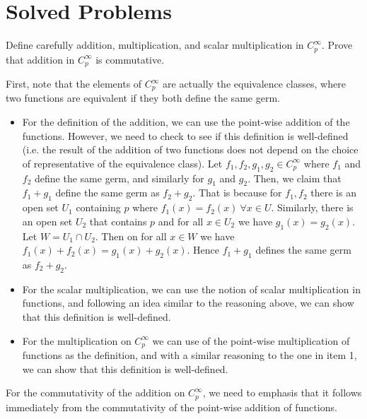 \section{Solved Problems}
\begin{problem}
	Define carefully addition, multiplication, and scalar multiplication in $ C_p^\infty $. Prove that addition in $ C_p^\infty $ is commutative.
\end{problem}
\begin{solution}
	First, note that the elements of $ C_p^\infty $ are actually the equivalence classes, where two functions are equivalent if they both define the same germ.
	\begin{itemize}
		\item For the definition of the addition, we can use the point-wise addition of the functions. However, we need to check to see if this definition is well-defined (i.e. the result of the addition of two functions does not depend on the choice of representative of the equivalence class). Let $ f_1, f_2, g_1, g_2 \in C_p^\infty$ where $ f_1 $ and $ f_2 $ define the same germ, and similarly for $ g_1 $ and $ g_2 $. Then, we claim that $ f_1+g_1 $ define the same germ as $ f_2 + g_2 $. That is because for $ f_1, f_2 $ there is an open set $ U_1 $ containing $ p $ where $ f_1(x) = f_2(x) \ \forall x \in U $. Similarly, there is an open set $ U_2 $ that contains $ p $ and for all $ x \in U_2 $ we have $ g_1(x) = g_2(x) $. Let $ W = U_1 \cap U_2 $. Then on for all $ x \in W $ we have $ f_1(x) + f_2(x) = g_1(x) + g_2(x) $. Hence $ f_1+g_1 $ defines the same germ as $ f_2 + g_2 $.
		\item For the scalar multiplication, we can use the notion of scalar multiplication in functions, and following an idea similar to the reasoning above, we can show that this definition is well-defined.
		\item For the multiplication on $ C_p^\infty $ we can use of the point-wise multiplication of functions as the definition, and with a similar reasoning to the one in item 1, we can show that this definition is well-defined.
	\end{itemize}
	For the commutativity of the addition on $ C_p^\infty $, we need to emphasis that it follows immediately from the commutativity of the point-wise addition of functions.
	
\end{solution}


